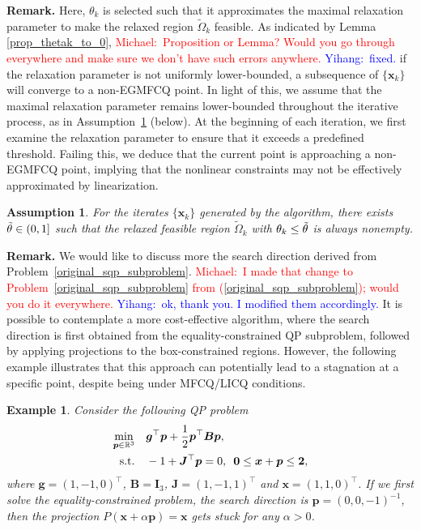 \documentclass[aos]{imsart}
\numberwithin{equation}{section}
\theoremstyle{plain}
\newtheorem{example}{Example}
\newtheorem{assumption}{Assumption}
\newcommand{\michael}[1]{\textcolor{red}{Michael:\ #1}}
\newcommand{\yihang}[1]{\textcolor{blue}{Yihang:\ #1}}
\begin{document}
\textbf{Remark.} 
Here, $\theta_k$ is selected such that it approximates the maximal relaxation parameter to make the relaxed region $\widetilde{\Omega}_k$ feasible. 
As indicated by Lemma \ref{prop_thetak_to_0}, 
\michael{Proposition or Lemma? Would you go through everywhere and make sure we don't have such errors anywhere.}
\yihang{fixed.}
if the relaxation parameter is not uniformly lower-bounded, a subsequence of $\{\bm{x}_k\}$ will converge to a non-EGMFCQ point. 
In light of this, we assume that the maximal relaxation parameter remains lower-bounded throughout the iterative process, as in Assumption~\ref{assump1} (below). 
At the beginning of each iteration, we first examine the relaxation parameter to ensure that it exceeds a predefined threshold. 
Failing this, we deduce that the current point is approaching a non-EGMFCQ point, implying that the nonlinear constraints may not be effectively approximated by linearization.

\begin{assumption}
\label{assump1}
For the iterates $\{\bm{x}_k\}$ generated by the algorithm, there exists $\Tilde{\theta} \in (0,1]$ such that the relaxed feasible region $\widetilde{\Omega}_k$ with $\theta_k \leq \Tilde{\theta}$ is always nonempty.
\end{assumption}


\textbf{Remark.} We would like to discuss more the search direction derived from Problem~\eqref{original_sqp_subproblem}.
\michael{I made that change to Problem~\eqref{original_sqp_subproblem} from (\ref{original_sqp_subproblem}); would you do it everywhere.}
\yihang{ok, thank you. I modified them accordingly.}
It is possible to contemplate a more cost-effective algorithm, where the search direction is first obtained from the equality-constrained QP subproblem, followed by applying projections to the box-constrained regions. However, the following example illustrates that this approach can potentially lead to a stagnation at a specific point, despite being under MFCQ/LICQ conditions. 
\begin{example}
    Consider the following QP problem
    \begin{equation*}
        \begin{split}
            \min_{\bm{p} \in \mathbb{R}^{3}} & \hspace{1em} \bm{g}^{\top} \bm{p} + \frac{1}{2} \bm{p}^{\top} \bm{B} \bm{p},\\
            \text{s.t.} & \hspace{1em} -1 + \bm{J}^{\top} \bm{p} = 0, \hspace{0.5em} \bm{0} \leq \bm{x} + \bm{p} \leq \bm{2},
        \end{split}
    \end{equation*}
    where $\bm{g} = (1,-1,0)^{\top}$, $\bm{B} = \bm{I}_3$, $\bm{J} = (1,-1,1)^{\top}$ and $\bm{x} = (1, 1, 0)^{\top}$. If we first solve the equality-constrained problem, the search direction is $\bm{p} = (0,0,-1)^{-1}$, then the projection $P(\bm{x}+\alpha \bm{p}) = \bm{x}$ gets stuck for any $\alpha > 0$.
\end{example}
\end{document}
